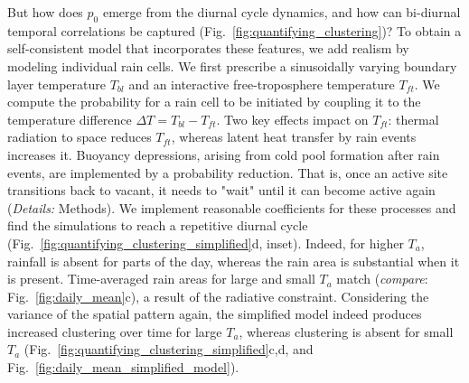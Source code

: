 \documentclass{article}
\begin{document}
But how does $p_0$ emerge from the diurnal cycle dynamics, and how can bi-diurnal temporal correlations be captured (Fig.~\ref{fig:quantifying_clustering})?
To obtain a self-consistent model that incorporates these features, we add realism by modeling individual rain cells.
We first prescribe a sinusoidally varying boundary layer temperature $T_{bl}$ and an interactive free-troposphere temperature $T_{ft}$.
We compute the probability for a rain cell to be initiated by coupling it to the temperature difference $\Delta T=T_{bl}-T_{ft}$.
Two key effects impact on $T_{ft}$: 
thermal radiation to space reduces $T_{ft}$, whereas latent heat transfer by rain events increases it.
Buoyancy depressions, arising from cold pool formation after rain events, are implemented by a probability reduction. That is, once an active site transitions back to vacant, it needs to "wait" until it can become active again 
({\it Details:} Methods).
We implement reasonable coefficients for these processes and find the simulations to reach a repetitive diurnal cycle (Fig.~\ref{fig:quantifying_clustering_simplified}d, inset).
Indeed, for higher $T_a$, rainfall is absent for parts of the day, whereas the rain area is substantial when it is present. 
Time-averaged rain areas for large and small $T_a$ match ({\it compare}: Fig.~\ref{fig:daily_mean}c), a result of the radiative constraint.
Considering the variance of the spatial pattern again, the simplified model indeed produces increased clustering over time for large $T_a$, whereas clustering is absent for small $T_a$ (Fig.~\ref{fig:quantifying_clustering_simplified}c,d, and Fig.~\ref{fig:daily_mean_simplified_model}).
\end{document}
